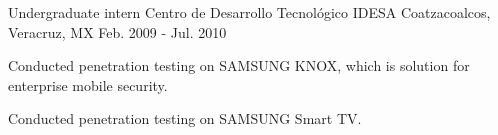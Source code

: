 \begin{cventries}
\cventry
{Undergraduate intern} %
{Centro de Desarrollo Tecnológico IDESA} %
{Coatzacoalcos, Veracruz, MX} %
{Feb. 2009 - Jul. 2010} %
{ %
\begin{cvitems}
\item {Conducted penetration testing on SAMSUNG KNOX, which is solution for enterprise mobile security.}
\item {Conducted penetration testing on SAMSUNG Smart TV.}
\end{cvitems}
}


\end{cventries}